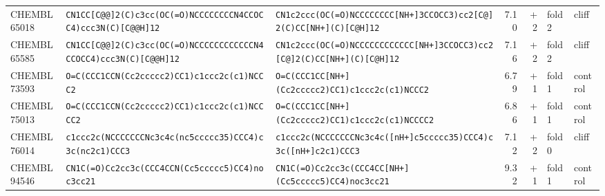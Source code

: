 \begin{longtable}{l p{4.4cm} p{4.4cm} r r l l}
CHEMBL65018 & \texttt{CN1CC[C@@]\allowbreak{}2(\allowbreak{}C)\allowbreak{}c3cc(\allowbreak{}OC(\allowbreak{}=\allowbreak{}O)\allowbreak{}NCCCCCCCCN4CCOCC4)\allowbreak{}ccc3N(\allowbreak{}C)\allowbreak{}[C@@H]\allowbreak{}12} & \texttt{CN1c2ccc(\allowbreak{}OC(\allowbreak{}=\allowbreak{}O)\allowbreak{}NCCCCCCCC[NH+]\allowbreak{}3CCOCC3)\allowbreak{}cc2[C@]\allowbreak{}2(\allowbreak{}C)\allowbreak{}CC[NH+]\allowbreak{}(\allowbreak{}C)\allowbreak{}[C@H]\allowbreak{}12} & 7.10 & +2 & fold 2 & cliff \\
CHEMBL65585 & \texttt{CN1CC[C@@]\allowbreak{}2(\allowbreak{}C)\allowbreak{}c3cc(\allowbreak{}OC(\allowbreak{}=\allowbreak{}O)\allowbreak{}NCCCCCCCCCCCCN4CCOCC4)\allowbreak{}ccc3N(\allowbreak{}C)\allowbreak{}[C@@H]\allowbreak{}12} & \texttt{CN1c2ccc(\allowbreak{}OC(\allowbreak{}=\allowbreak{}O)\allowbreak{}NCCCCCCCCCCCC[NH+]\allowbreak{}3CCOCC3)\allowbreak{}cc2[C@]\allowbreak{}2(\allowbreak{}C)\allowbreak{}CC[NH+]\allowbreak{}(\allowbreak{}C)\allowbreak{}[C@H]\allowbreak{}12} & 7.16 & +2 & fold 2 & cliff \\
CHEMBL73593 & \texttt{O=\allowbreak{}C(\allowbreak{}CCC1CCN(\allowbreak{}Cc2ccccc2)\allowbreak{}CC1)\allowbreak{}c1ccc2c(\allowbreak{}c1)\allowbreak{}NCCC2} & \texttt{O=\allowbreak{}C(\allowbreak{}CCC1CC[NH+]\allowbreak{}(\allowbreak{}Cc2ccccc2)\allowbreak{}CC1)\allowbreak{}c1ccc2c(\allowbreak{}c1)\allowbreak{}NCCC2} & 6.79 & +1 & fold 1 & control \\
CHEMBL75013 & \texttt{O=\allowbreak{}C(\allowbreak{}CCC1CCN(\allowbreak{}Cc2ccccc2)\allowbreak{}CC1)\allowbreak{}c1ccc2c(\allowbreak{}c1)\allowbreak{}NCCCC2} & \texttt{O=\allowbreak{}C(\allowbreak{}CCC1CC[NH+]\allowbreak{}(\allowbreak{}Cc2ccccc2)\allowbreak{}CC1)\allowbreak{}c1ccc2c(\allowbreak{}c1)\allowbreak{}NCCCC2} & 6.86 & +1 & fold 1 & control \\
CHEMBL76014 & \texttt{c1ccc2c(\allowbreak{}NCCCCCCCNc3c4c(\allowbreak{}nc5ccccc35)\allowbreak{}CCC4)\allowbreak{}c3c(\allowbreak{}nc2c1)\allowbreak{}CCC3} & \texttt{c1ccc2c(\allowbreak{}NCCCCCCCNc3c4c(\allowbreak{}[nH+]\allowbreak{}c5ccccc35)\allowbreak{}CCC4)\allowbreak{}c3c(\allowbreak{}[nH+]\allowbreak{}c2c1)\allowbreak{}CCC3} & 7.12 & +2 & fold 0 & cliff \\
CHEMBL94546 & \texttt{CN1C(\allowbreak{}=\allowbreak{}O)\allowbreak{}Cc2cc3c(\allowbreak{}CCC4CCN(\allowbreak{}Cc5ccccc5)\allowbreak{}CC4)\allowbreak{}noc3cc21} & \texttt{CN1C(\allowbreak{}=\allowbreak{}O)\allowbreak{}Cc2cc3c(\allowbreak{}CCC4CC[NH+]\allowbreak{}(\allowbreak{}Cc5ccccc5)\allowbreak{}CC4)\allowbreak{}noc3cc21} & 9.32 & +1 & fold 1 & control \\
\end{longtable}
